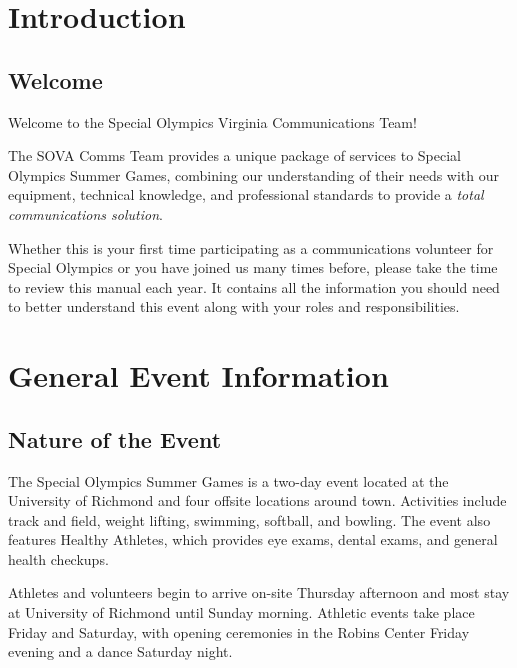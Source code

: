 \documentclass[pdflatex,letterpaper,twoside,12pt]{book}
\begin{document}
\chapter{Introduction}

\section{Welcome}

Welcome to the Special Olympics Virginia Communications Team!

The SOVA Comms Team provides a unique package of services to Special Olympics Summer Games, combining our understanding of their needs with our equipment, technical knowledge, and professional standards to provide a \emph{total communications solution}.

Whether this is your first time participating as a communications volunteer for Special Olympics or you have joined us many times before, please take the time to review this manual each year.  It contains all the information you should need to better understand this event along with your roles and responsibilities.


\chapter{General Event Information}

\section{Nature of the Event}

The Special Olympics Summer Games is a two-day event located at the University of Richmond and four offsite locations around town.  Activities include track and field, weight lifting, swimming, softball, and bowling.  The event also features Healthy Athletes, which provides eye exams, dental exams, and general health checkups.

Athletes and volunteers begin to arrive on-site Thursday afternoon and most stay at University of Richmond until Sunday morning.  Athletic events take place Friday and Saturday, with opening ceremonies in the Robins Center Friday evening and a dance Saturday night.
\end{document}
